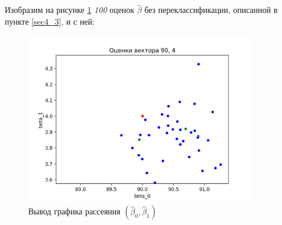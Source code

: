 \documentclass[a4paper,14pt]{extarticle}
\begin{document}
Изобразим на рисунке \ref{pic_3} \textit{100} оценок $\hat{\beta}$ без переклассификации, описанной в пункте \ref{sec4_3}, и с ней:\hfill\break
\begin{figure}[h]
    \centering
    \includegraphics[width=100mm]{pics/plot_90_4_with-without_(2).png}
    \caption{Вывод графика рассеяния $(\hat{\beta}_0,\hat{\beta}_1)$\label{overflow}}
    \label{pic_3}
\end{figure}
\break
\end{document}
